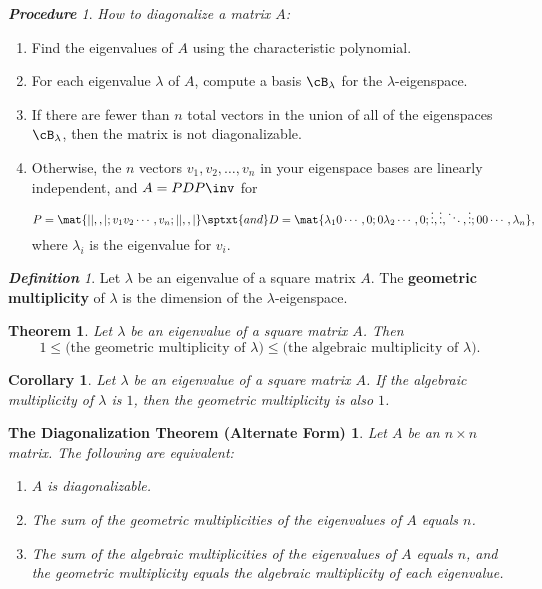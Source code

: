 \documentclass[12pt]{amsart}
\newenvironment{oneoffThm}[2][plain]{%
  \addtocounter{jdrthmtype}{1}%
  \theoremstyle{#1}%
  \newtheorem*{oneoff\thejdrthmtype}{#2}%
  \begin{oneoff\thejdrthmtype}}{%
  \end{oneoff\thejdrthmtype}}
\theoremstyle{plain}
\newtheorem*{Thm}{Theorem}
\newtheorem*{Cor}{Corollary}
\theoremstyle{remark}
\newtheorem*{proc}{\bf Procedure}
\newtheorem*{Defn}{\bf Definition}
\begin{document}
\begin{proc}
 \textsl{How to diagonalize a matrix $A$:}
\begin{enumerate}
\item Find the eigenvalues of $A$ using the characteristic polynomial. 
\item For each eigenvalue $\lambda$ of $A$, compute a basis $\cB_\lambda$ for the
  $\lambda$-eigenspace.
\item If there are fewer than $n$ total vectors in the union of all of the
  eigenspaces $\cB_\lambda$, then the matrix is not diagonalizable.
\item Otherwise, the $n$ vectors $v_1,v_2,\ldots,v_n$ in your eigenspace bases are
  linearly independent, and $A = PDP\inv$ for
  \[ P = \mat{| |,, |; v_1 v_2 \cdots, v_n; | | ,, |} \sptxt{and}
  D = \mat{\lambda_1 0 \cdots, 0;
    0 \lambda_2 \cdots, 0;
    \vdots, \vdots, \ddots, \vdots;
    0 0 \cdots, \lambda_n}, \]
  where $\lambda_i$ is the eigenvalue for $v_i$.

\end{enumerate}
  
\end{proc}

\begin{Defn}
  Let $\lambda$ be an eigenvalue of a square matrix $A$.  The 
  \textbf{geometric multiplicity} of $\lambda$ is the dimension of the
  $\lambda$-eigenspace. 
\end{Defn}

\begin{Thm}
  Let $\lambda$ be an eigenvalue of a square matrix $A$.  Then
  \[ 1 \leq \text{(the geometric multiplicity of $\lambda$)}
  \leq \text{(the algebraic multiplicity of $\lambda$)}. \]
\end{Thm}

\begin{Cor}
  Let $\lambda$ be an eigenvalue of a square matrix $A$.  If the algebraic
  multiplicity of $\lambda$ is $1$, then the geometric multiplicity is also $1$.
\end{Cor}

\begin{oneoffThm}{The Diagonalization Theorem (Alternate Form)}
  Let $A$ be an $n\times n$ matrix.  The following are equivalent:
  \begin{enumerate}
  \item $A$ is diagonalizable.
  \item The sum of the geometric multiplicities of the eigenvalues of $A$ equals
    $n$.
  \item The sum of the algebraic multiplicities of the eigenvalues of $A$ equals
    $n$, and \emph{the geometric multiplicity equals the algebraic multiplicity} of
    each eigenvalue.
  \end{enumerate}
\end{oneoffThm}
\end{document}
